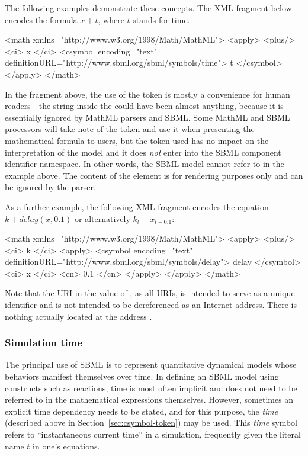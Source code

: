 The following examples demonstrate these concepts.  The XML fragment below
encodes the formula $x + t$, where $t$ stands for time.

\begin{example}
<math xmlns="http://www.w3.org/1998/Math/MathML">
    <apply>
        <plus/>
        <ci> x </ci>
        <csymbol encoding="text" definitionURL="http://www.sbml.org/sbml/symbols/time">
            t
        </csymbol>
    </apply>
</math>
\end{example}

In the fragment above, the use of the token  is mostly a
convenience for human readers---the string inside the
 could have been almost anything, because it is
essentially ignored by MathML parsers and SBML.  Some MathML and
SBML processors will take note of the token and use it when
presenting the mathematical formula to users, but the token used
has no impact on the interpretation of the model and it does
\emph{not} enter into the SBML component identifier namespace.  In
other words, the SBML model cannot refer to  in the
example above.  The content of the  element is for
rendering purposes only and can be ignored by the parser.

As a further example, the following XML fragment encodes the equation
$k + delay(x, 0.1)$ or alternatively $k_t + x_{t - 0.1}$:

\begin{example}
<math xmlns="http://www.w3.org/1998/Math/MathML">
    <apply>
        <plus/>
        <ci> k </ci>
        <apply>
            <csymbol encoding="text" definitionURL="http://www.sbml.org/sbml/symbols/delay">
                delay
            </csymbol>
            <ci> x </ci>
            <cn> 0.1 </cn>
        </apply>
    </apply>
</math>
\end{example}

Note that the URI in the value of , as all
URIs, is intended to serve as a unique identifier and is not
intended to be dereferenced as an Internet address.  There is
nothing actually located at the address
.


\subsubsection{Simulation time}
\label{sec:meaning-of-time}

The principal use of SBML is to represent quantitative dynamical
models whose behaviors manifest themselves over time.  In defining
an SBML model using constructs such as reactions, time is most
often implicit and does not need to be referred to in the
mathematical expressions themselves.  However, sometimes an
explicit time dependency needs to be stated, and for this purpose,
the \emph{time}  (described above in
Section~\ref{sec:csymbol-token}) may be used.  This \emph{time}
symbol refers to ``instantaneous current time'' in a simulation,
frequently given the literal name $t$ in one's equations.

